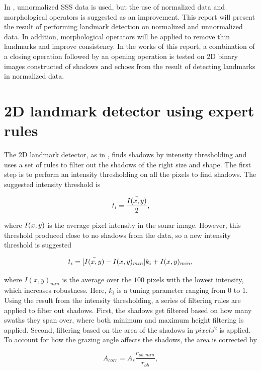 In \cite{Al-Rawi2017LandmarkImages}, unnormalized SSS data is used, but the use of normalized data and morphological operators is suggested as an improvement. This report will present the result of performing landmark detection on normalized and unnormalized data. In addition, morphological operators will be applied to remove thin landmarks and improve consistency. In the works of this report, a combination of a closing operation followed by an opening operation is tested on 2D binary images constructed of shadows and echoes from the result of detecting landmarks in normalized data. 

\section{2D landmark detector using expert rules}

The 2D landmark detector, as in \cite{Leblond2019SonarProject}, finds shadows by intensity thresholding and uses a set of rules to filter out the shadows of the right size and shape. The first step is to perform an intensity thresholding on all the pixels to find shadows. The suggested intensity threshold is

\begin{equation}
    t_i = \frac{\Bar{I(x,y)}}{2},
    \label{eq:orginal_int_thres}
\end{equation}

where $\Bar{I(x,y)}$ is the average pixel intensity in the sonar image. However, this threshold produced close to no shadows from the data, so a new intensity threshold is suggested

\begin{equation}
    t_i = [\Bar{I(x,y)} - I(x,y)_{min}] k_i + I(x,y)_{min},
\end{equation}

where $I(x,y)_{min}$ is the average over the $100$ pixels with the lowest intensity, which increases robustness. Here, $k_i$ is a tuning parameter ranging from $0$ to $1$. Using the result from the intensity thresholding, a series of filtering rules are applied to filter out shadows. First, the shadows get filtered based on how many swaths they span over, where both minimum and maximum height filtering is applied. Second, filtering based on the area of the shadows in $pixels^2$ is applied. To account for how the grazing angle affects the shadows, the area is corrected by

\begin{equation}
    A_{corr} = A_s \frac{r_{ob,min}}{r_{ob}},
    \label{eq:corrected_area}
\end{equation}

